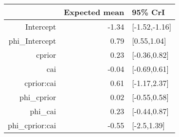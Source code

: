 \begin{tabular}{rrl}
  \hline
 & Expected mean & 95\% CrI \\ 
  \hline
Intercept & -1.34 & [-1.52,-1.16] \\ 
  phi\_Intercept & 0.79 & [0.55,1.04] \\ 
  cprior & 0.23 & [-0.36,0.82] \\ 
  cai & -0.04 & [-0.69,0.61] \\ 
  cprior:cai & 0.61 & [-1.17,2.37] \\ 
  phi\_cprior & 0.02 & [-0.55,0.58] \\ 
  phi\_cai & 0.23 & [-0.44,0.87] \\ 
  phi\_cprior:cai & -0.55 & [-2.5,1.39] \\ 
   \hline
\end{tabular}

